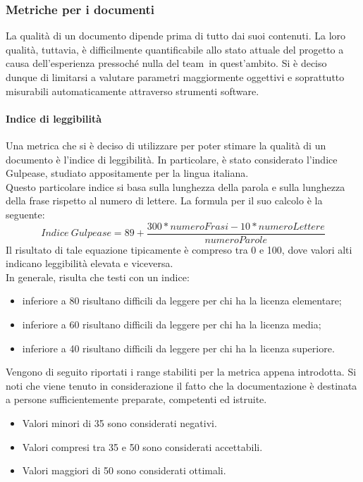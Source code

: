 \documentclass[../PianoDiQualifica.tex]{subfiles}
\begin{document}
			\subsubsection{Metriche per i documenti}
			La qualità di un documento dipende prima di tutto dai suoi contenuti. La loro qualità, tuttavia, è difficilmente quantificabile allo stato attuale del progetto a causa dell'esperienza pressoché nulla del team\g\ in quest'ambito. Si è deciso dunque di limitarsi a valutare parametri maggiormente oggettivi e soprattutto misurabili automaticamente attraverso strumenti software\g.
				\paragraph{Indice di leggibilità}
				Una metrica che si è deciso di utilizzare per poter stimare la qualità di un documento è l'indice di leggibilità. In particolare, è stato considerato l'indice Gulpease\g, studiato appositamente per la lingua italiana.				\\Questo particolare indice si basa sulla lunghezza della parola e sulla lunghezza della frase rispetto al numero di lettere. La formula per il suo calcolo è la seguente:
				\begin{equation}
					Indice \  Gulpease = 89 + \frac{300*numeroFrasi-10*numeroLettere}{numeroParole}
				\end{equation}
				Il risultato di tale equazione tipicamente è compreso tra 0 e 100, dove valori alti indicano leggibilità elevata e viceversa.\\
				In generale, risulta che testi con un indice:
				\begin{itemize}
					\item inferiore a 80 risultano difficili da leggere per chi ha la licenza elementare;
					\item inferiore a 60 risultano difficili da leggere per chi ha la licenza media;
				\item inferiore a 40 risultano difficili da leggere per chi ha la licenza superiore.
				\end{itemize}
				Vengono di seguito riportati i range stabiliti per la metrica appena introdotta. Si noti che viene tenuto in considerazione il fatto che la documentazione è destinata a persone sufficientemente preparate, competenti ed istruite.
				\begin{itemize}
					\item Valori minori di 35 sono considerati negativi.
					\item Valori compresi tra 35 e 50 sono considerati accettabili.
					\item Valori maggiori di 50 sono considerati ottimali. 
				\end{itemize}
\end{document}
